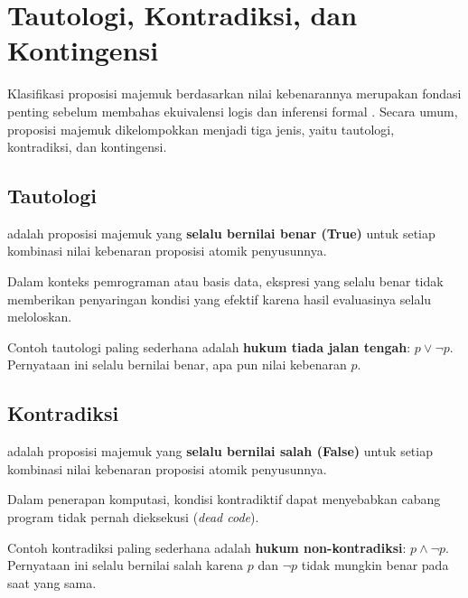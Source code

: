 \section{Tautologi, Kontradiksi, dan Kontingensi}

Klasifikasi proposisi majemuk berdasarkan nilai kebenarannya merupakan fondasi penting sebelum membahas ekuivalensi logis dan inferensi formal \cite{rosen2019}. Secara umum, proposisi majemuk dikelompokkan menjadi tiga jenis, yaitu tautologi, kontradiksi, dan kontingensi.

\subsection{Tautologi}

\begin{definisi}[Tautologi]
 adalah proposisi majemuk yang \textbf{selalu bernilai benar (True)} untuk setiap kombinasi nilai kebenaran proposisi atomik penyusunnya.
\end{definisi}

Dalam konteks pemrograman atau basis data, ekspresi yang selalu benar tidak memberikan penyaringan kondisi yang efektif karena hasil evaluasinya selalu meloloskan.

\begin{contoh}
Contoh tautologi paling sederhana adalah \textbf{hukum tiada jalan tengah}: $p \vee \neg p$. \\
Pernyataan ini selalu bernilai benar, apa pun nilai kebenaran $p$.
\end{contoh}

\subsection{Kontradiksi}

\begin{definisi}[Kontradiksi]
 adalah proposisi majemuk yang \textbf{selalu bernilai salah (False)} untuk setiap kombinasi nilai kebenaran proposisi atomik penyusunnya.
\end{definisi}

Dalam penerapan komputasi, kondisi kontradiktif dapat menyebabkan cabang program tidak pernah dieksekusi (\textit{dead code}).

\begin{contoh}
Contoh kontradiksi paling sederhana adalah \textbf{hukum non-kontradiksi}: $p \wedge \neg p$. \\
Pernyataan ini selalu bernilai salah karena $p$ dan $\neg p$ tidak mungkin benar pada saat yang sama.
\end{contoh}

